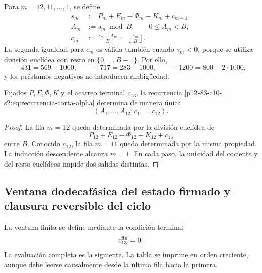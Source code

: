 Para \(m=12,11,\ldots,1\), se define
\begin{equation}
\begin{aligned}
 s_m&:=P_m+E_m-\Phi_m-K_m+c_{m+1},\\
 A_m&:=s_m\bmod B,
       \qquad 0\leq A_m<B,\\
 c_m&:=\frac{s_m-A_m}{B}
      =\left\lfloor\frac{s_m}{B}\right\rfloor .
\end{aligned}
\label{p12-83-c10-s2:eq:recurrencia-corta-alpha}
\end{equation}
La segunda igualdad para \(c_m\) es válida también cuando \(s_m<0\),
porque se utiliza división euclídea con resto en
\(\{0,\ldots,B-1\}\). Por ello,
\[
 -431=569-1000,
 \qquad
 -717=283-1000,
 \qquad
 -1200=800-2\cdot1000,
\]
y los préstamos negativos no introducen ambigüedad.

\begin{theorem}
\label{p12-83-c10-s2:thm:unicidad-acarreo-orientado-alpha}
Fijados \(P,E,\Phi,K\) y el acarreo terminal \(c_{13}\), la recurrencia
\eqref{p12-83-c10-s2:eq:recurrencia-corta-alpha} determina de manera única
\[
 (A_1,\ldots,A_{12};c_1,\ldots,c_{12}).
\]
\end{theorem}

\begin{proof}
La fila \(m=12\) queda determinada por la división euclídea de
\[
 P_{12}+E_{12}-\Phi_{12}-K_{12}+c_{13}
\]
entre \(B\). Conocido \(c_{12}\), la fila \(m=11\) queda determinada por
la misma propiedad. La inducción descendente alcanza \(m=1\). En cada
paso, la unicidad del cociente y del resto euclídeos impide dos salidas
distintas.
\end{proof}

\subsection{Ventana dodecafásica del estado firmado y clausura reversible del ciclo}

La ventana finita se define mediante la condición terminal
\[
 c_{13}^{\rm fin}=0.
\]
La evaluación completa es la siguiente. La tabla se imprime en orden
creciente, aunque debe leerse causalmente desde la última fila hacia la
primera.

